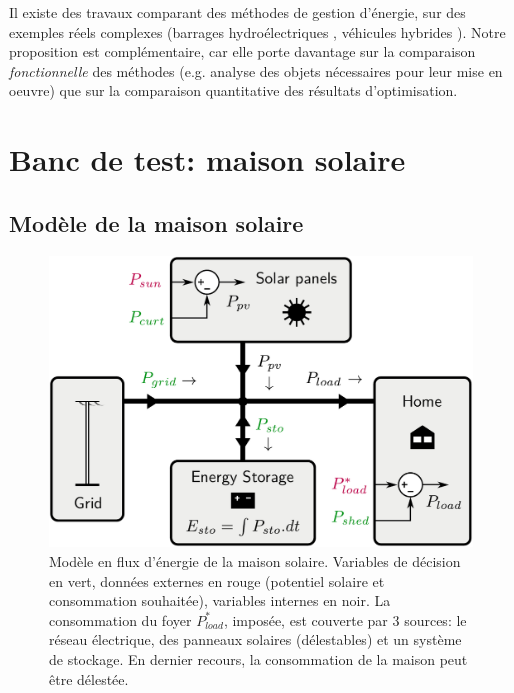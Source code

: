 \documentclass[a4paper,10pt,twocolumn]{article}
\begin{document}
Il existe des travaux comparant des méthodes de gestion d'énergie, sur des exemples réels complexes
(barrages hydroélectriques \cite{Zambelli:2011:SBA}, véhicules hybrides \cite{Jiang:2017:ToVT}).
Notre proposition est complémentaire, car elle porte davantage sur la comparaison \emph{fonctionnelle}
des méthodes (e.g. analyse des objets nécessaires pour leur mise en oeuvre) que
sur la comparaison quantitative des résultats d'optimisation.

\section{Banc de test: maison solaire}

\subsection{Modèle de la maison solaire}

\begin{figure}[!ht]
        \begin{center}
                \includegraphics[width=0.9\columnwidth]{figures/solar_home.pdf}
        \end{center}

        \caption{Modèle en flux d'énergie de la maison solaire.
        Variables de décision en vert, données externes en rouge (potentiel solaire et consommation souhaitée), variables internes en noir.
        La consommation du foyer $P_{load}^*$, imposée, est couverte par 3 sources:
        le réseau électrique, des panneaux solaires (délestables)
        et un système de stockage.
        En dernier recours, la consommation de la maison peut être délestée.
        }
        \label{fig:solhome}
\end{figure}
\end{document}
